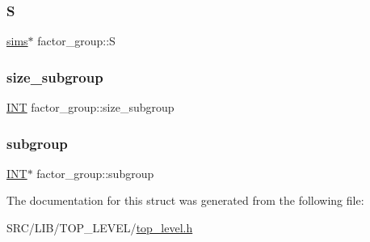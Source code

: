 \mbox{\label{structfactor__group_a328bdac7e2e1680c85507d9e2b748586}} 
\subsubsection{\texorpdfstring{S}{S}}
{\footnotesize\ttfamily \mbox{\hyperlink{classsims}{sims}}$\ast$ factor\+\_\+group\+::S}

\mbox{\label{structfactor__group_ad707dc01fcaf4074a25f2be448f2c7bc}} 
\subsubsection{\texorpdfstring{size\+\_\+subgroup}{size\_subgroup}}
{\footnotesize\ttfamily \mbox{\hyperlink{galois_8h_a09fddde158a3a20bd2dcadb609de11dc}{I\+NT}} factor\+\_\+group\+::size\+\_\+subgroup}

\mbox{\label{structfactor__group_a451249bcf132ee2bd59f200461ab989e}} 
\subsubsection{\texorpdfstring{subgroup}{subgroup}}
{\footnotesize\ttfamily \mbox{\hyperlink{galois_8h_a09fddde158a3a20bd2dcadb609de11dc}{I\+NT}}$\ast$ factor\+\_\+group\+::subgroup}



The documentation for this struct was generated from the following file\+:\begin{DoxyCompactItemize}
\item 
S\+R\+C/\+L\+I\+B/\+T\+O\+P\+\_\+\+L\+E\+V\+E\+L/\mbox{\hyperlink{top__level_8h}{top\+\_\+level.\+h}}\end{DoxyCompactItemize}
